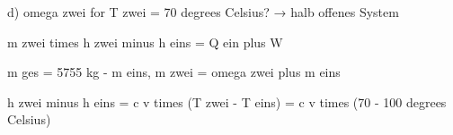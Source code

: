 d) omega zwei for T zwei = 70 degrees Celsius? → halb offenes System

m zwei times h zwei minus h eins = Q ein plus W

m ges = 5755 kg - m eins, m zwei = omega zwei plus m eins

h zwei minus h eins = c v times (T zwei - T eins) = c v times (70 - 100 degrees Celsius)